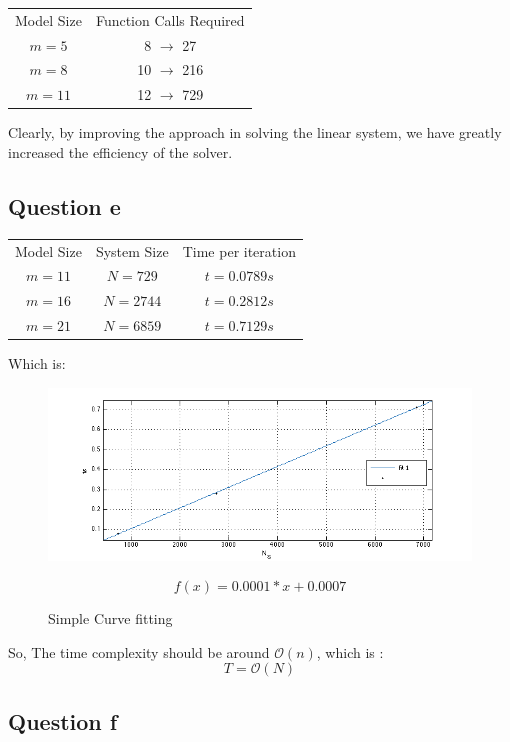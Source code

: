 \documentclass[11pt]{article}
\begin{document}
\begin{center}
\begin{tabular}{c c}
Model Size & Function Calls Required \\
$m = 5$& 8 $\rightarrow$ 27\\
$m = 8$&10 $\rightarrow$ 216\\
$m = 11$&12 $\rightarrow$ 729
\end{tabular}
\end{center}

Clearly, by improving the approach in solving the linear system, we have greatly increased the efficiency of the solver.

\subsection{Question e}

\begin{center}
\begin{tabular}{c c c}
Model Size & System Size & Time per iteration\\
$m = 11$ & $ N = 729 $ & $t = 0.0789s$\\
$m = 16$ & $ N = 2744 $ & $t = 0.2812s$\\
$m = 21$ & $ N = 6859 $ & $t = 0.7129s$
\end{tabular}
\end{center}

\FloatBarrier 
Which is:
\begin{figure}
\centering
\includegraphics[scale=0.6]{curve_fit2.png}
    \caption{Simple Curve fitting}
    \begin{minipage}{0.75\textwidth}
    {\footnotesize $$f(x) = 0.0001*x+0.0007$$}
    \end{minipage}
    \end{figure}
    \FloatBarrier
So, The time complexity should be around $\mathcal{O}(n)$, which is :
$$T = \mathcal{O}(N)$$
\FloatBarrier

\subsection{Question f}
\end{document}
